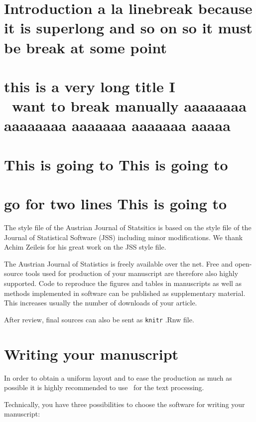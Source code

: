 \documentclass[article]{ajs}
\begin{document}
\section{Introduction a la linebreak because it is superlong and so on so it must be break at some point}

\section[this is a very long title I want to break manually aaaaaaaa aaaaaaaa aaaaaaa aaaaaaa aaaaa]{this is a very long title I\\\ want to break manually aaaaaaaa aaaaaaaa aaaaaaa aaaaaaa aaaaa}

\section[my section]{This is going to This is going to \\ \\ go for two lines This is going to }

The style file of the Austrian Journal of Statsitics is based on the style file of the Journal of Statistical Software (JSS) including minor modifications. We thank Achim Zeileis for his great work on the JSS style file.

The Austrian Journal of Statistics is freely available over the net. Free and open-source tools used for production of your manuscript are therefore also highly supported. Code to reproduce the figures and tables in manuscripts as well as methods implemented in software can be published as supplementary material. This increases usually the number of 
downloads of your article.

After review, final sources can also be sent as \texttt{knitr} \citep{knitr} .Rnw file.



\section{Writing your manuscript}

In order to obtain a uniform layout and to ease the production as
much as possible it is highly recommended to use \LaTeXe\ for the
text processing. 


Technically, you have three possibilities to choose the software for writing your manuscript:
\end{document}
